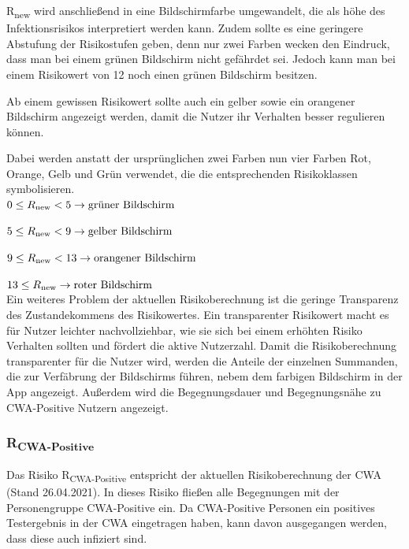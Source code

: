 \documentclass[conference,compsoc]{IEEEtran}
\begin{document}
R\textsubscript{new} wird anschließend in eine Bildschirmfarbe umgewandelt, die als höhe des Infektionsrisikos interpretiert werden kann.
Zudem sollte es eine geringere Abstufung der Risikostufen geben, denn nur zwei Farben wecken den Eindruck, dass man bei einem grünen Bildschirm nicht gefährdet sei.
Jedoch kann man bei einem Risikowert von 12 noch einen grünen Bildschirm besitzen.

Ab einem gewissen Risikowert sollte auch ein gelber sowie ein orangener Bildschirm angezeigt werden, damit die Nutzer ihr Verhalten besser regulieren können.

Dabei werden anstatt der ursprünglichen zwei Farben nun vier Farben Rot, Orange, Gelb und Grün verwendet, die die entsprechenden Risikoklassen symbolisieren.
\\

$0\le R\textsubscript{new} < 5 \rightarrow \text{grüner Bildschirm}$

$5\le R\textsubscript{new} < 9 \rightarrow \text{gelber Bildschirm}$

$9\le R\textsubscript{new} < 13 \rightarrow \text{orangener Bildschirm}$

$13 \le R\textsubscript{new}  \rightarrow \text{roter Bildschirm}$
\\

Ein weiteres Problem der aktuellen Risikoberechnung ist die geringe Transparenz des Zustandekommens des Risikowertes.
Ein transparenter Risikowert macht es für Nutzer leichter nachvollziehbar, wie sie sich bei einem erhöhten Risiko Verhalten sollten und fördert die aktive Nutzerzahl.
Damit die Risikoberechnung transparenter für die Nutzer wird, werden die Anteile der einzelnen Summanden, die zur Verfäbrung der Bildschirms führen,
nebem dem farbigen Bildschirm in der App angezeigt.
Außerdem wird die Begegnungsdauer und Begegnungsnähe zu CWA-Positive Nutzern angezeigt.\\

\subsubsection{R\textsubscript{CWA-Positive}}\label{CWAPositive}

Das Risiko R\textsubscript{CWA-Positive} entspricht der aktuellen Risikoberechnung der CWA (Stand 26.04.2021). 
In dieses Risiko fließen alle Begegnungen mit der Personengruppe CWA-Positive ein. 
Da CWA-Positive Personen ein positives Testergebnis in der CWA eingetragen haben, kann davon ausgegangen werden, dass diese auch infiziert sind.
\end{document}
